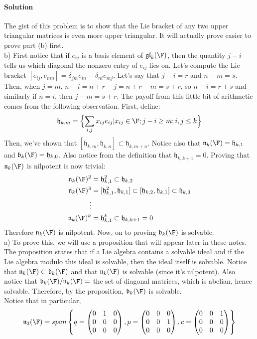 \documentclass[11pt]{article}
\newcommand{\gl}{\ensuremath{\mathfrak{gl}}}
\newcommand{\h}{\ensuremath{\mathfrak{h}}}
\newcommand{\bk}{\ensuremath{\mathfrak{b}}}
\newcommand{\nk}{\ensuremath{\mathfrak{n}}}
\begin{document}
\paragraph{Solution}
The gist of this problem is to show that the Lie bracket of any two upper triangular
matrices is even more upper triangular. It will actually prove easier to prove part (b)
first. \\
b) First notice that if $e_{ij}$ is a basis element of $\gl_k(\F)$, then the quantity $j-i$
tells us which diagonal the nonzero entry of $e_{ij}$ lies on. Let's compute the Lie
bracket $[e_{ij},e_{mn}] = \delta_{jm}e_{in} - \delta_{ni}e_{mj}$. Let's say that
$j-i=r$ and $n-m=s$. Then, when $j=m$, $n-i=n+r-j=n+r-m=s+r$, so $n-i=r+s$ and similarly
if $n=i$, then $j-m = s+r$. The payoff from this little bit of arithmetic comes from the
following observation. First, define:
\begin{equation}
\h_{k,m} = \Bigl\{\sum_{i,j}x_{ij}e_{ij} |x_{ij} \in \F; j-i \geq m; i,j \leq k \Bigr\}
\end{equation}
Then, we've shown that $[\h_{k,m},\h_{k,n}] \subset \h_{k,m+n}$. Notice also that
$\nk_k(\F) = \h_{k,1}$ and $\bk_k(\F) = \h_{k,0}$. Also notice from the definition
that $\h_{k,k+1} = 0$. Proving that $\nk_k(\F)$ is nilpotent is now trivial:
\begin{align*}
\nk_k(\F)^2 & = \h_{k,1}^2 \subset \h_{k,2} \\
\nk_k(\F)^3 & = [\h_{k,1}^2,\h_{k,1}] \subset [\h_{k,2},\h_{k,1}] \subset \h_{k,3} \\
\vdots & \\
\nk_k(\F)^k &= \h_{k,1}^k \subset \h_{k,k+1} = 0 \\
\end{align*}
Therefore $\nk_k(\F)$ is nilpotent. Now, on to proving $\bk_k(\F)$ is solvable. \\
a) To prove this, we will use a proposition that will appear later in these notes. The
proposition states that if a Lie algebra contains a solvable ideal and if the Lie algebra
modulo this ideal is solvable, then the ideal itself is solvable. Notice that 
$\nk_k(\F) \subset \bk_k(\F)$ and that $\nk_k(\F)$ is solvable (since it's nilpotent).
Also notice that $\bk_k(\F)/\nk_k(\F) = $ the set of diagonal matrices, which is abelian, hence
solvable. Therefore, by the proposition, $\bk_k(\F)$ is solvable. \\
Notice that in particular, 
\begin{equation}
\nk_3(\F) = span \left\{ q = \begin{pmatrix} 0 & 1 & 0\\ 0&0&0\\0&0&0 \end{pmatrix},
p = \begin{pmatrix} 0&0&0\\ 0&0&1\\0&0&0 \end{pmatrix},
c = \begin{pmatrix} 0 & 0 & 1\\ 0&0&0\\0&0&0 \end{pmatrix} \right\}
\end{equation}
\end{document}
